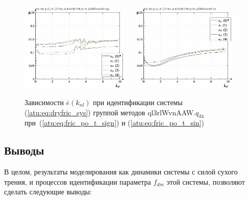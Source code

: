 \begin{figure}[htb!]
  \centerline{
    \includegraphics[width=0.49\textwidth]{p/cha/fric/ql3rlWvnAAW/fric_id-p_k_nl_sign.png}
    \hfill
    \includegraphics[width=0.49\textwidth]{p/cha/fric/ql3rlWvnAAW/fric_id-p_k_nl_sin.png}
  }
  \caption{Зависимости $\overline{e}(k_{nl})$ при идентификации системы (\ref{atu:eq:dryfric_sys}) группой методов ql3rlWvnAAW.$q_\mathrm{dx}$
   при~(\ref{atu:eq:fric_po_t_sign}) и (\ref{atu:eq:fric_po_t_sin})}
  \label{atu:f:fric_k_nl_ql3rlWvnAAW_q_dx}
\end{figure}



\subsection{Выводы}  %

В целом, результаты моделирования как динамики системы с силой сухого трения,
и процессов идентификации параметра $f_{dm}$ этой системы,
позволяют сделать следующие выводы:

